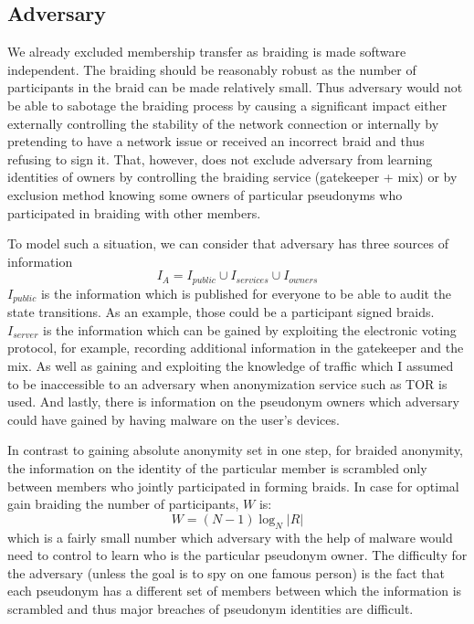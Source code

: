 \documentclass[12pt]{article}
\begin{document}
\subsection*{Adversary}

We already excluded membership transfer as braiding is made software independent. The braiding should be reasonably robust as the number of participants in the braid can be made relatively small. Thus adversary would not be able to sabotage the braiding process by causing a significant impact either externally controlling the stability of the network connection or internally by pretending to have a network issue or received an incorrect braid and thus refusing to sign it. That, however, does not exclude adversary from learning identities of owners by controlling the braiding service (gatekeeper + mix) or by exclusion method knowing some owners of particular pseudonyms who participated in braiding with other members.

To model such a situation, we can consider that adversary has three sources of information
\begin{equation}
  I_A = I_{public} \cup I_{services} \cup I_{owners}
\end{equation}
$I_{public}$ is the information which is published for everyone to be able to audit the state transitions. As an example, those could be a participant signed braids. $I_{server}$ is the information which can be gained by exploiting the electronic voting protocol, for example, recording additional information in the gatekeeper and the mix. As well as gaining and exploiting the knowledge of traffic which I assumed to be inaccessible to an adversary when anonymization service such as TOR is used. And lastly, there is information on the pseudonym owners which adversary could have gained by having malware on the user's devices.

In contrast to gaining absolute anonymity set in one step, for braided anonymity, the information on the identity of the particular member is scrambled only between members who jointly participated in forming braids. In case for optimal gain braiding the number of participants, $W$ is:
\begin{equation}
  W = (N -1) \log_N |R|
\end{equation}
which is a fairly small number which adversary with the help of malware would need to control to learn who is the particular pseudonym owner. The difficulty for the adversary (unless the goal is to spy on one famous person) is the fact that each pseudonym has a different set of members between which the information is scrambled and thus major breaches of pseudonym identities are difficult.
\end{document}
